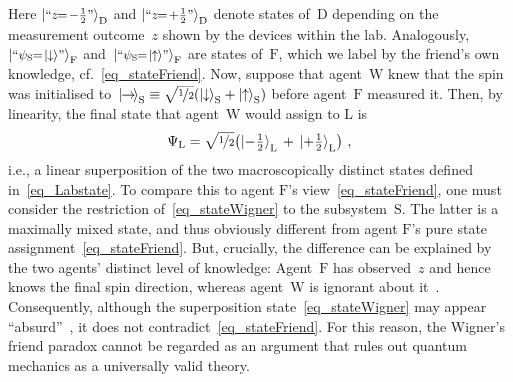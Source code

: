 \documentclass{article}
\theoremstyle{mystyle}
\theoremstyle{definition}
\newcommand*{\ket}[1]{{| #1 \rangle}}
\newcommand*{\Friend}{\mathrm{F}}
\newcommand*{\Lab}{\mathrm{L}}
\newcommand*{\Wigner}{\mathrm{W}}
\newcommand*{\Spin}{\mathrm{S}}
\newcommand*{\spinup}{\ket{{\hspace{-0.1ex}\uparrow\hspace{-0.1ex}}}}
\newcommand*{\spindown}{\ket{{\hspace{-0.1ex}\downarrow\hspace{-0.1ex}}}}
\newcommand*{\spinright}{\ket{{\hspace{-0.2ex}\rightarrow\hspace{-0.4ex}}}}
\newcommand*{\sminus}{{\textstyle - \frac{1}{2}}}
\newcommand*{\splus}{{\textstyle + \frac{1}{2}}}
\begin{document}
Here $\ket{\text{\footnotesize ``$z \!\! = \! \sminus$''}}_{\mathrm{D}}$ and $\ket{\text{\footnotesize ``$z \!\! = \! \splus$''}}_{\mathrm{D}}$ denote states of~$\mathrm{D}$ depending on the measurement outcome~$z$ shown by the devices within the lab.  Analogously, $\ket{\text{\footnotesize ``$\psi_{\Spin} \!\! = \! \spindown$''}}_{\mathrm{F}}$ and~$\ket{\text{\footnotesize ``$\psi_{\Spin} \!\!= \! \spinup$''}}_{\mathrm{F}}$ are states of~$\Friend$, which we label by the friend's own knowledge, cf.~\eqref{eq_stateFriend}. Now, suppose that agent~$\Wigner$ knew that the spin was initialised to~$\spinright_{\Spin} \equiv \smash{\sqrt{\nicefrac{1}{2}}(\spindown_{\Spin} + \spinup_{\Spin})}$ before agent~$\Friend$ measured it. Then, by linearity, the final state that agent~$\Wigner$ would assign to $\Lab$ is 
\begin{align} \label{eq_stateWigner}
   \Psi_{\Lab} = \sqrt{\nicefrac{1}{2}} \bigl( \ket{\sminus}_{\Lab} \, + \,  \ket{\splus}_{\Lab}  \bigr) \ ,
 \end{align}
 i.e., a linear superposition of the two macroscopically distinct  states defined in~\eqref{eq_Labstate}. To compare this to agent $\Friend$'s view~\eqref{eq_stateFriend}, one must consider the restriction of~\eqref{eq_stateWigner} to the subsystem~$\Spin$. The latter is a maximally mixed state, and thus  obviously different from agent $\Friend$'s pure state assignment~\eqref{eq_stateFriend}. But, crucially, the difference can be explained by the two agents' distinct level of knowledge: Agent~$\Friend$ has observed~$z$ and hence knows the final spin direction, whereas agent~$\Wigner$ is ignorant about it~\cite{Fuchs10}.   Consequently, although the superposition state~\eqref{eq_stateWigner} may appear ``absurd''~\cite{Wigner67}, it does not contradict~\eqref{eq_stateFriend}. For this reason, the Wigner's friend paradox cannot be regarded as an argument that rules out quantum mechanics as a universally valid theory.
 
 
\end{document}
